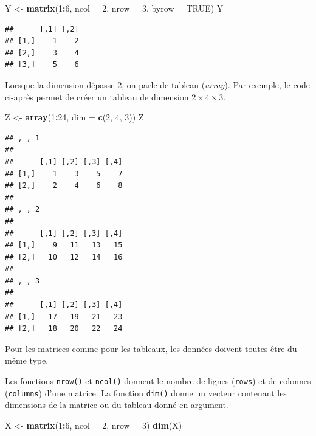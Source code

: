 \documentclass[
  11pt,
]{book}
\newenvironment{Shaded}{\begin{snugshade}}{\end{snugshade}}
\newcommand{\DataTypeTok}[1]{\textcolor[rgb]{0.13,0.29,0.53}{#1}}
\newcommand{\DecValTok}[1]{\textcolor[rgb]{0.00,0.00,0.81}{#1}}
\newcommand{\KeywordTok}[1]{\textcolor[rgb]{0.13,0.29,0.53}{\textbf{#1}}}
\newcommand{\NormalTok}[1]{#1}
\newcommand{\OperatorTok}[1]{\textcolor[rgb]{0.81,0.36,0.00}{\textbf{#1}}}
\newcommand{\OtherTok}[1]{\textcolor[rgb]{0.56,0.35,0.01}{#1}}
\newcommand{\StringTok}[1]{\textcolor[rgb]{0.31,0.60,0.02}{#1}}
\numberwithin{equation}{section}
\numberwithin{countremarque}{section}
\begin{document}
\begin{Shaded}
\begin{Highlighting}[]
\NormalTok{Y \textless{}{-}}\StringTok{ }\KeywordTok{matrix}\NormalTok{(}\DecValTok{1}\OperatorTok{:}\DecValTok{6}\NormalTok{, }\DataTypeTok{ncol =} \DecValTok{2}\NormalTok{, }\DataTypeTok{nrow =} \DecValTok{3}\NormalTok{, }\DataTypeTok{byrow =} \OtherTok{TRUE}\NormalTok{)}
\NormalTok{Y}
\end{Highlighting}
\end{Shaded}

\begin{lstlisting}
##      [,1] [,2]
## [1,]    1    2
## [2,]    3    4
## [3,]    5    6
\end{lstlisting}

Lorsque la dimension dépasse 2, on parle de tableau (\emph{array}). Par exemple, le code ci-après permet de créer un tableau de dimension \(2\times 4 \times 3\).

\begin{Shaded}
\begin{Highlighting}[]
\NormalTok{Z \textless{}{-}}\StringTok{ }\KeywordTok{array}\NormalTok{(}\DecValTok{1}\OperatorTok{:}\DecValTok{24}\NormalTok{, }\DataTypeTok{dim =} \KeywordTok{c}\NormalTok{(}\DecValTok{2}\NormalTok{, }\DecValTok{4}\NormalTok{, }\DecValTok{3}\NormalTok{))}
\NormalTok{Z}
\end{Highlighting}
\end{Shaded}

\begin{lstlisting}
## , , 1
## 
##      [,1] [,2] [,3] [,4]
## [1,]    1    3    5    7
## [2,]    2    4    6    8
## 
## , , 2
## 
##      [,1] [,2] [,3] [,4]
## [1,]    9   11   13   15
## [2,]   10   12   14   16
## 
## , , 3
## 
##      [,1] [,2] [,3] [,4]
## [1,]   17   19   21   23
## [2,]   18   20   22   24
\end{lstlisting}

Pour les matrices comme pour les tableaux, les données doivent toutes être du même type.

Les fonctions \texttt{nrow()} et \texttt{ncol()} donnent le nombre de lignes (\texttt{rows}) et de colonnes (\texttt{columns}) d'une matrice. La fonction \texttt{dim()} donne un vecteur contenant les dimensions de la matrice ou du tableau donné en argument.

\begin{Shaded}
\begin{Highlighting}[]
\NormalTok{X \textless{}{-}}\StringTok{ }\KeywordTok{matrix}\NormalTok{(}\DecValTok{1}\OperatorTok{:}\DecValTok{6}\NormalTok{, }\DataTypeTok{ncol =} \DecValTok{2}\NormalTok{, }\DataTypeTok{nrow =} \DecValTok{3}\NormalTok{)}
\KeywordTok{dim}\NormalTok{(X)}
\end{Highlighting}
\end{Shaded}
\end{document}
